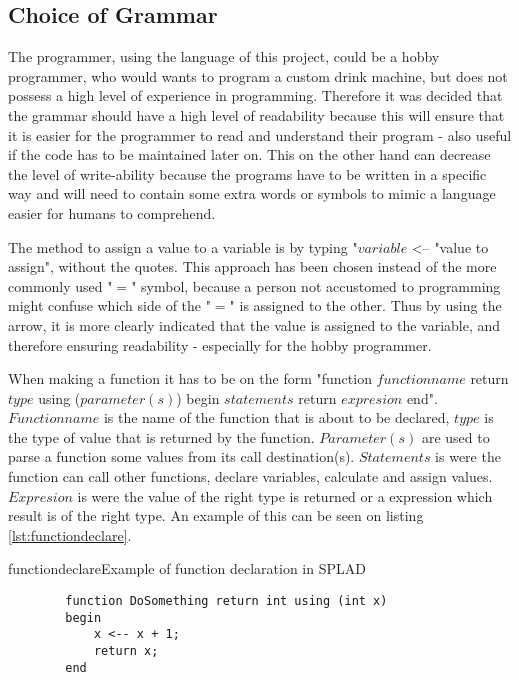 \subsection{Choice of Grammar}
\label{sec:grammarchoice}
The programmer, using the language of this project, could be a hobby programmer, who would wants to program a custom drink machine, but does not possess a high level of experience in programming. Therefore it was decided that the grammar should have a high level of readability because this will ensure that it is easier for the programmer to read and understand their program - also useful if the code has to be maintained later on. This on the other hand can decrease the level of write-ability because the programs have to be written in a specific way and will need to contain some extra words or symbols to mimic a language easier for humans to comprehend.

The method to assign a value to a variable is by typing "$variable$ <-- "value to assign", without the quotes. This approach has been chosen instead of the more commonly used "$=$" symbol, because a person not accustomed to programming might confuse which side of the "$=$" is assigned to the other. Thus by using the arrow, it is more clearly indicated that the value is assigned to the variable, and therefore ensuring readability - especially for the hobby programmer.

When making a function it has to be on the form "function $functionname$ return $type$ using ($parameter(s)$) begin $statements$ return $expresion$ end". $Functionname$ is the name of the function that is about to be declared, $type$ is the type of value that is returned by the function. $Parameter(s)$ are used to parse a function some values from its call destination(s). $Statements$ is were the function can call other functions, declare variables, calculate and assign values. $Expresion$ is were the value of the right type is returned or a expression which result is of the right type.
An example of this can be seen on listing \ref{lst:functiondeclare}.

\begin{code}{functiondeclare}{Example of function declaration in SPLAD}
	\begin{lstlisting}
		function DoSomething return int using (int x)
		begin
			x <-- x + 1;
			return x;
		end
	\end{lstlisting}
\end{code}

